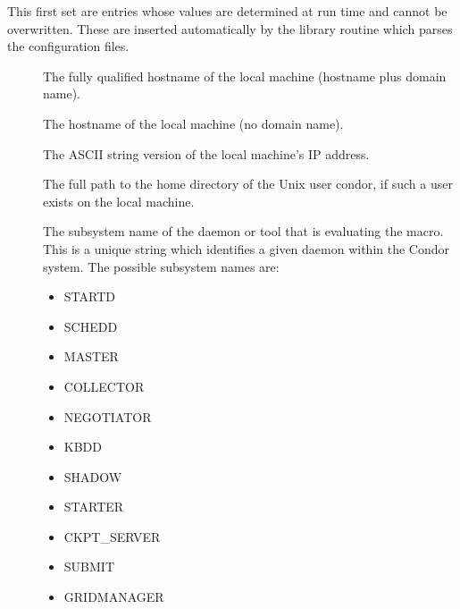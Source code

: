 This first set are entries whose values are determined at
run time and cannot be overwritten.  These are inserted automatically by
the library routine which parses the configuration files.
\begin{description}
  
\item[] \label{param:FullHostname}
  The
  fully qualified hostname of the local machine (hostname plus domain
  name).
  
\item[] \label{param:Hostname}
  The hostname of the local machine (no domain name).
  
\item[] \label{param:IpAddress}
  The ASCII string version of the local machine's IP address.

\item[] \label{param:Tilde}
  The full path to the
  home directory of the Unix user condor, if such a user exists on the
  local machine.

\label{sec:Condor-Subsystem-Names}
\item[] \label{param:Subsystem}
  The subsystem
  name of the daemon or tool that is evaluating the macro.
  This is a unique string which identifies a given daemon within the
  Condor system.  The possible subsystem names are:

  \begin{itemize}
  \item STARTD
  \item SCHEDD
  \item MASTER
  \item COLLECTOR
  \item NEGOTIATOR
  \item KBDD 
  \item SHADOW
  \item STARTER
  \item CKPT\_SERVER
  \item SUBMIT
  \item GRIDMANAGER
  \label{list:subsystem names}
  \end{itemize}

\end{description}

